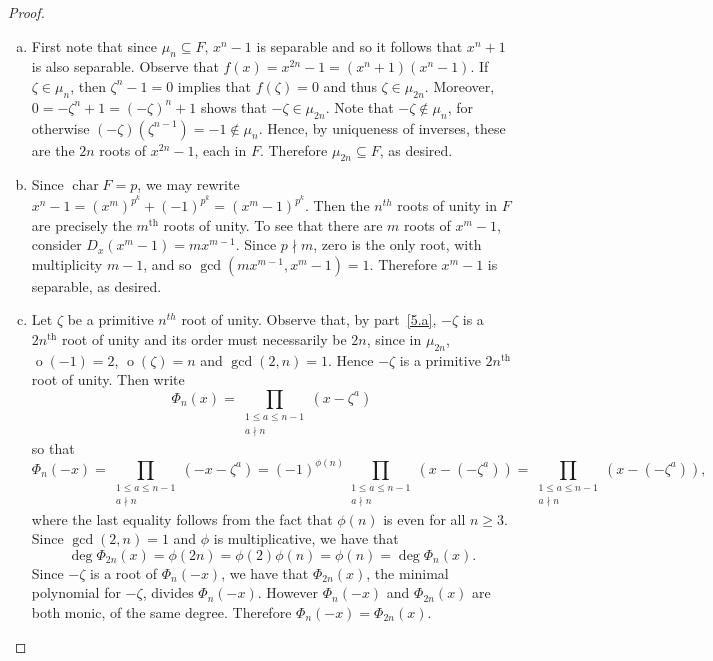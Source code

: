 \documentclass[10pt]{amsart}
\begin{document}
\begin{thm}
  \begin{proof}
    \begin{enumerate}[(a)]
    \item\label{5.a}
      First note that since $\mu_n \subseteq F$, $x^{n} - 1$ is separable and so it follows that $x^n + 1$ is also separable.
      Observe that $f(x) = x^{2n} - 1 = (x^n + 1)(x^n - 1)$.
      If $\zeta \in \mu_n$, then $\zeta^n - 1 = 0$ implies that $f(\zeta) = 0$ and thus $\zeta \in \mu_{2n}$.
      Moreover, $0 = -\zeta^n + 1 = (-\zeta)^n + 1$ shows that $-\zeta \in \mu_{2n}$.
      Note that $-\zeta \not \in \mu_n$, for otherwise $(-\zeta)(\zeta^{n-1}) = -1 \not \in \mu_n$.
      Hence, by uniqueness of inverses, these are the $2n$ roots of $x^{2n} - 1$, each in $F$.
      Therefore $\mu_{2n} \subseteq F$, as desired.
    \item\label{5.b}
      Since $\operatorname{char} F = p$, we may rewrite $x^n - 1 = (x^m)^{p^k} + (-1)^{p^k} = (x^m - 1)^{p^k}$.
      Then the $n^{th}$ roots of unity in $F$ are precisely the $m^{\text{th}}$ roots of unity.
      To see that there are $m$ roots of $x^m - 1$, consider $D_x(x^m - 1) = mx^{m-1}$.
      Since $p \nmid m$, zero is the only root, with multiplicity $m - 1$, and so $\gcd(mx^{m-1}, x^m - 1) = 1$.
      Therefore $x^m - 1$ is separable, as desired.
    \item\label{5.c}
      Let $\zeta$ be a primitive $n^{th}$ root of unity.
      Observe that, by part~\eqref{5.a}, $-\zeta$ is a $2n^\text{th}$ root of unity and its order must necessarily be $2n$, since in $\mu_{2n}$, $\operatorname{o}(-1) = 2$, $\operatorname{o}(\zeta) = n$ and $\gcd(2,n) = 1$.
      Hence $-\zeta$ is a primitive $2n^\text{th}$ root of unity.
      Then write 
      $$\Phi_n(x) = \prod_{\substack{1 \leq a \leq {n-1}\\a \nmid n}}(x - \zeta^a)$$
      so that
      $$\Phi_n(-x) = \prod_{\substack{1 \leq a \leq {n-1}\\a \nmid n}}(-x - \zeta^a) = (-1)^{\phi(n)} \prod_{\substack{1 \leq a \leq {n-1}\\a \nmid n}}(x - (-\zeta^a)) = \prod_{\substack{1 \leq a \leq {n-1}\\a \nmid n}}(x - (-\zeta^a)),$$
      where the last equality follows from the fact that $\phi(n)$ is even for all $n \geq 3$.
      Since $\gcd(2,n) = 1$ and $\phi$ is multiplicative, we have that $$\deg{\Phi_{2n}(x)} = \phi(2n) = \phi(2)\phi(n) = \phi(n) = \deg{\Phi_n(x)}.$$
      Since $-\zeta$ is a root of $\Phi_n(-x)$, we have that $\Phi_{2n}(x)$, the minimal polynomial for $-\zeta$, divides $\Phi_n(-x)$.
      However $\Phi_n(-x)$ and $\Phi_{2n}(x)$ are both monic, of the same degree.
      Therefore $\Phi_n(-x) = \Phi_{2n}(x)$.
    \end{enumerate}
  \end{proof}
\end{thm}
\end{document}
